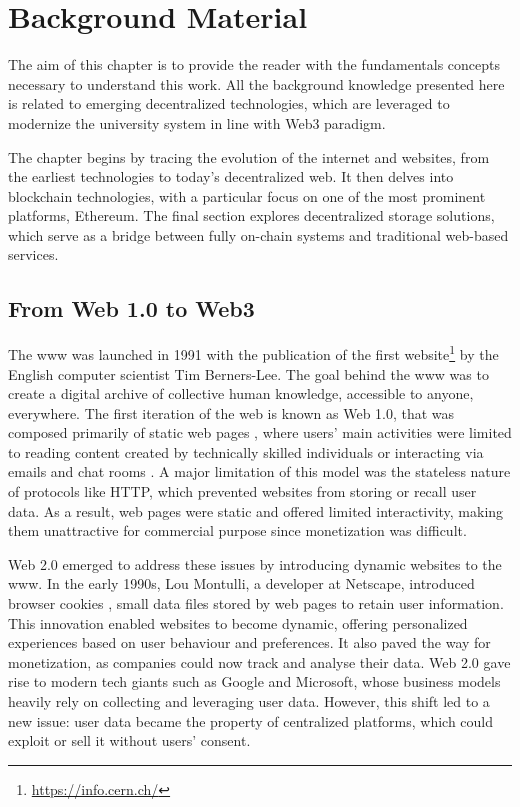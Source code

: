 \chapter{Background Material}
\label{chap:background}
The aim of this chapter is to provide the reader with the fundamentals concepts necessary to understand this work. All the background knowledge presented here is related to emerging decentralized technologies, which are leveraged to modernize the university system in line with Web3 paradigm.

The chapter begins by tracing the evolution of the internet and websites, from the earliest technologies to today's decentralized web. It then delves into blockchain technologies, with a particular focus on one of the most prominent platforms, Ethereum. The final section explores decentralized storage solutions, which serve as a bridge between fully on-chain systems and traditional web-based services.

\section{From Web 1.0 to Web3}
\label{sec:web3}
The \gls{www} \cite{berners1992world} was launched in 1991 with the publication of the first website\footnote{\url{https://info.cern.ch/}} by the English computer scientist Tim Berners-Lee. The goal behind the \acrshort{www} was to create a digital archive of collective human knowledge, accessible to anyone, everywhere. The first iteration of the web is known as Web 1.0, that was composed primarily of static web pages \cite{choudhury2014world}, where users' main activities were limited to reading content created by technically skilled individuals or interacting via emails and chat rooms \cite{murray2023promise}. A major limitation of this model was the stateless nature of protocols like HTTP, which prevented websites from storing or recall user data. As a result, web pages were static and offered limited interactivity, making them unattractive for commercial purpose since monetization was difficult.

Web 2.0 emerged to address these issues by introducing dynamic websites to the \gls{www}. In the early 1990s, Lou Montulli, a developer at Netscape, introduced browser cookies \cite{kristol1997rfc2109}, small data files stored by web pages to retain user information. This innovation enabled websites to become dynamic, offering personalized experiences based on user behaviour and preferences. It also paved the way for monetization, as companies could now track and analyse their data. Web 2.0 gave rise to modern tech giants such as Google and Microsoft, whose business models heavily rely on collecting and leveraging user data. However, this shift led to a new issue: user data became the property of centralized platforms, which could exploit or sell it without users' consent.

